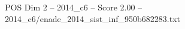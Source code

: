 \begin{textsample}{POS Dim 2 – 2014\_c6 – Score 2.00 – 2014\_c6/enade\_2014\_sist\_inf\_950b682283.txt}
\end{textsample}
